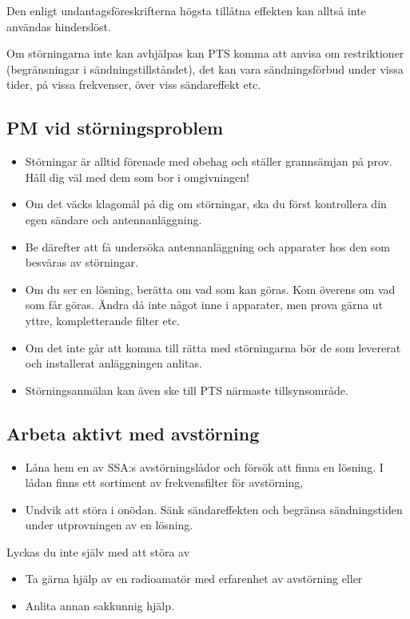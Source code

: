 Den enligt undantagsföreskrifterna högsta tillåtna effekten kan alltså inte användas hinderslöst.

Om störningarna inte kan avhjälpas kan PTS komma att anvisa om restriktioner
(begränsningar i sändningstillståndet), det kan vara sändningsförbud under
vissa tider, på vissa frekvenser, över viss sändareffekt etc.

\subsection{PM vid störningsproblem}
\begin{itemize}
\item Störningar är alltid förenade med obehag och ställer grannsämjan
  på prov. Håll dig väl med dem som bor i omgivningen!
\item Om det väcks klagomål på dig om störningar, ska du först
  kontrollera din egen sändare och antennanläggning.
\item Be därefter att få undersöka antennanläggning och apparater hos
  den som besväras av störningar.
\item Om du ser en lösning, berätta om vad som kan göras. Kom överens
  om vad som får göras. Ändra då inte något inne i apparater, men
  prova gärna ut yttre, kompletterande filter etc.
\item Om det inte går att komma till rätta med störningarna bör de som
  levererat och installerat anläggningen anlitas.
\item Störningsanmälan kan även ske till PTS närmaste tillsynsområde.
\end{itemize}

\subsection{Arbeta aktivt med avstörning}
\begin{itemize}
\item Låna hem en av SSA:s avstörningslådor och försök att finna en
  lösning. I lådan finns ett sortiment av frekvensfilter för
  avstörning,
\item Undvik att störa i onödan. Sänk sändareffekten och begränsa
  sändningstiden under utprovningen av en lösning.
\end{itemize}

Lyckas du inte själv med att störa av
\begin{itemize}
\item Ta gärna hjälp av en radioamatör med erfarenhet av avstörning
  eller
\item Anlita annan sakkunnig hjälp.
\end{itemize}
